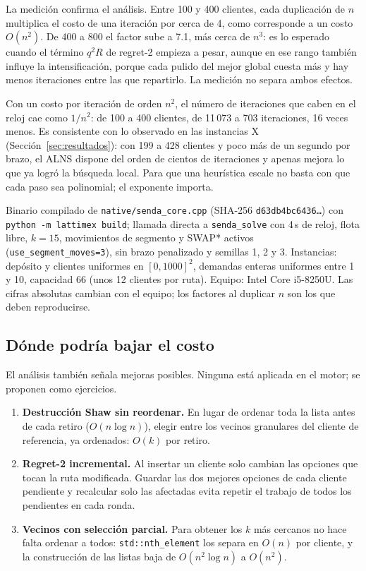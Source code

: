 \documentclass[11pt,a4paper]{article}
\newcommand{\tsl}[1]{\texttt{\small #1}}
\begin{document}
La medición confirma el análisis. Entre 100 y 400 clientes, cada duplicación de $n$ multiplica el
costo de una iteración por cerca de 4, como corresponde a un costo $O(n^2)$. De 400 a 800 el factor
sube a 7.1, más cerca de $n^3$: es lo esperado cuando el término $q^2R$ de regret-2 empieza a pesar,
aunque en ese rango también influye la intensificación, porque cada pulido del mejor global cuesta
más y hay menos iteraciones entre las que repartirlo. La medición no separa ambos efectos.

\begin{leccion}
Con un costo por iteración de orden $n^2$, el número de iteraciones que caben en el reloj cae como
$1/n^2$: de 100 a 400 clientes, de 11\,073 a 703 iteraciones, 16 veces menos. Es consistente con lo
observado en las instancias X (Sección~\ref{sec:resultados}): con 199 a 428 clientes y poco más de un
segundo por brazo, el ALNS dispone del orden de cientos de iteraciones y apenas mejora lo que ya logró
la búsqueda local. Para que una heurística escale no basta con que cada paso sea polinomial; el
exponente importa.
\end{leccion}

\begin{reproducir}
Binario compilado de \tsl{native/senda\_core.cpp} (SHA-256 \tsl{d63db4bc6436\ldots}) con
\tsl{python -m lattimex build}; llamada directa a \tsl{senda\_solve} con 4\,s de reloj, flota libre,
$k=15$, movimientos de segmento y SWAP* activos (\tsl{use\_segment\_moves=3}), sin brazo penalizado
y semillas 1, 2 y 3. Instancias: depósito y clientes uniformes en $[0,1000]^2$, demandas enteras
uniformes entre 1 y 10, capacidad 66 (unos 12 clientes por ruta). Equipo: Intel Core i5-8250U.
Las cifras absolutas cambian con el equipo; los factores al duplicar $n$ son los que deben
reproducirse.
\end{reproducir}

\subsection{Dónde podría bajar el costo}

El análisis también señala mejoras posibles. Ninguna está aplicada en el motor; se proponen como
ejercicios.
\begin{enumerate}[leftmargin=1.5em]
\item \textbf{Destrucción Shaw sin reordenar.} En lugar de ordenar toda la lista antes de cada retiro
($O(n\log n)$), elegir entre los vecinos granulares del cliente de referencia, ya ordenados:
$O(k)$ por retiro.
\item \textbf{Regret-2 incremental.} Al insertar un cliente solo cambian las opciones que tocan la
ruta modificada. Guardar las dos mejores opciones de cada cliente pendiente y recalcular solo las
afectadas evita repetir el trabajo de todos los pendientes en cada ronda.
\item \textbf{Vecinos con selección parcial.} Para obtener los $k$ más cercanos no hace falta
ordenar a todos: \tsl{std::nth\_element} los separa en $O(n)$ por cliente, y la construcción de las
listas baja de $O(n^2\log n)$ a $O(n^2)$.
\end{enumerate}
\end{document}

